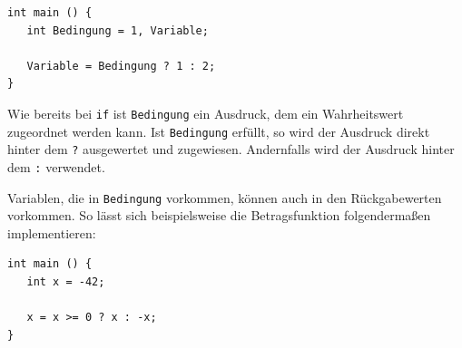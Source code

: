 \begin{codebox}
\begin{verbatim}
int main () {
   int Bedingung = 1, Variable;

   Variable = Bedingung ? 1 : 2;
}
\end{verbatim}
\end{codebox}

Wie bereits bei \texttt{if} ist \texttt{Bedingung} ein Ausdruck, dem ein Wahrheitswert zugeordnet werden kann. Ist \texttt{Bedingung} erfüllt, so wird der Ausdruck direkt hinter dem \texttt{?} ausgewertet und zugewiesen. Andernfalls wird der Ausdruck hinter dem \texttt{:} verwendet.

Variablen, die in \texttt{Bedingung} vorkommen, können auch in den Rückgabewerten vorkommen. So lässt sich beispielsweise die Betragsfunktion folgendermaßen implementieren:

\begin{codebox}
\begin{verbatim}
int main () {
   int x = -42;

   x = x >= 0 ? x : -x;
}
\end{verbatim}
\end{codebox}
